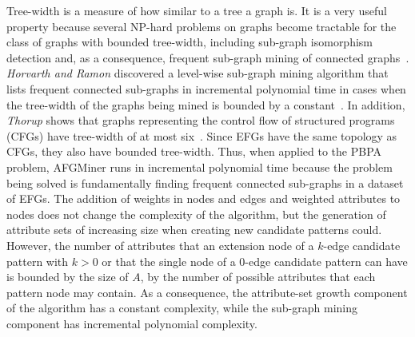Tree-width is a measure of how similar to a tree a graph is. It is a very useful property because several NP-hard problems on graphs become tractable for the class of graphs with bounded tree-width, including sub-graph isomorphism detection and, as a consequence, frequent sub-graph mining of connected graphs~\cite{Horvath}. \emph{Horvarth and Ramon} discovered a level-wise sub-graph mining algorithm that lists frequent connected sub-graphs in incremental polynomial time in cases when the tree-width of the graphs being mined is bounded by a constant~\cite{Horvath}. In addition, \emph{Thorup} shows that graphs representing the control flow of structured programs (\ie CFGs) have tree-width of at most six~\cite{Thorup}.  Since EFGs have the same topology as CFGs, they also have bounded tree-width. Thus, when applied to the PBPA problem, AFGMiner runs in incremental polynomial time because the problem being solved is fundamentally finding frequent connected sub-graphs in a dataset of EFGs. The addition of weights in nodes and edges and weighted attributes to nodes does not change the complexity of the algorithm, but the generation of attribute sets of increasing size when creating new candidate patterns could. However, the number of attributes that an extension node of a $k$-edge candidate pattern with $k > 0$ or that the single node of a 0-edge candidate pattern can have is bounded by the size of $A$, \ie by the number of possible attributes that each pattern node may contain. As a consequence, the attribute-set growth component of the algorithm has a constant complexity, while the sub-graph mining component has incremental polynomial complexity.


